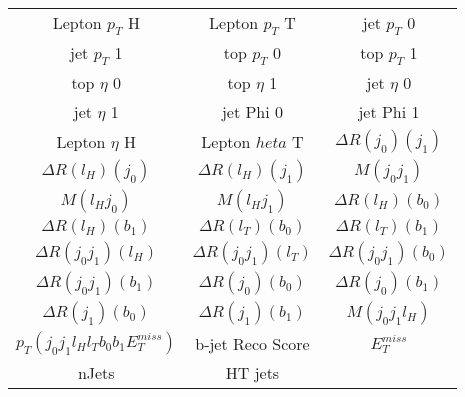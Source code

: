   \begin{center}
  \begin{tabular}{ccc}
    \hline\hline
    Lepton  $p_T$ H & Lepton  $p_T$ T & jet  $p_T$ 0 \\
    jet  $p_T$ 1 & top  $p_T$ 0 & top  $p_T$ 1 \\
    top  $\eta$ 0 & top  $\eta$ 1 & jet  $\eta$ 0 \\
    jet  $\eta$ 1 & jet Phi 0 & jet Phi 1 \\
    Lepton  $\eta$ H & Lepton  $heta$ T & $\Delta R(j_0)(j_1)$ \\
    $\Delta R(l_{H})(j_0)$ & $\Delta R(l_{H})(j_1)$ & $M(j_0j_1)$ \\
    $M(l_{H}j_0)$ & $M(l_{H}j_1)$ & $\Delta R(l_{H})(b_0)$ \\
    $\Delta R(l_{H})(b_1)$ & $\Delta R(l_{T})(b_0)$ & $\Delta R(l_{T})(b_1)$ \\
    $\Delta R(j_0j_1)(l_{H})$ & $\Delta R(j_0j_1)(l_{T})$ & $\Delta R(j_0j_1)(b_0)$ \\
    $\Delta R(j_0j_1)(b_1)$ & $\Delta R(j_0)(b_0)$ & $\Delta R(j_0)(b_1)$ \\
    $\Delta R(j_1)(b_0)$ & $\Delta R(j_1)(b_1)$ & $M(j_0j_1l_{H})$ \\
     $p_T(j_0j_1l_{H}l_{T}b_0b_1E_T^{miss})$ & b-jet Reco Score & $E_T^{miss}$ \\
    nJets & HT jets & \\
    \hline
  \end{tabular}
  \end{center}


